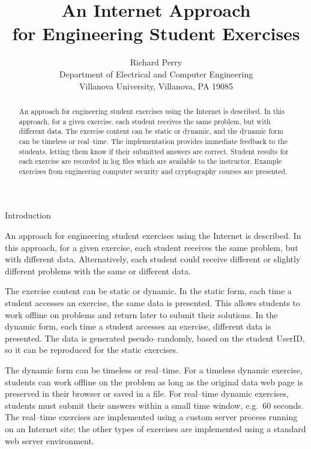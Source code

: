 \documentclass[12pt]{article}
\title{\bf
An Internet Approach\\
for Engineering Student Exercises
}
\date{}
\author{Richard Perry\\
Department of Electrical and Computer Engineering\\
Villanova University, Villanova, PA 19085
}
\begin{document}
\setlength{\parindent}{0.0in}

\maketitle 

\thispagestyle{fancy}

\begin{abstract}

\vspace{-22pt}

\noindent
An approach for engineering student exercises using the Internet
is described.  In this approach, for a given exercise, each student
receives the same problem, but with different data.  
The exercise content can be static or dynamic,
and the dynamic form can be timeless or real--time.
The implementation provides immediate feedback to the students, letting them
know if their submitted answers are correct.  
Student results for each exercise are recorded in log files which are
available to the instructor.
Example exercises from engineering computer security and cryptography courses
are presented.

\end{abstract}
\newpage

Introduction

\vspace{11pt}

An approach for engineering student exercises using the Internet
is described.  In this approach, for a given exercise, each student
receives the same problem, but with different data.
Alternatively,
each student could receive different or slightly different problems
with the same or different data.  

\vspace{11pt}

The exercise content can be static or dynamic.  
In the static form, each time a student 
accesses an exercise, the same data is presented.
This allows students to work offline on problems and return
later to submit their solutions.  
In the dynamic form, 
each time a student accesses an exercise, different data is presented.
The data
is generated pseudo--randomly, based on the student UserID, so it
can be reproduced for the static exercises.

\vspace{11pt}

The dynamic form can be timeless or real--time.  For a timeless dynamic
exercise, students can work offline on the problem as long as the original
data web page is preserved in their browser or saved in a file.
For real--time dynamic exercises, students must submit their answers
within a small time window, e.g.\ 60 seconds.
The real--time exercises are implemented using a custom server process
running on an Internet site; the other types of exercises are implemented
using a standard web server environment.
\end{document}
